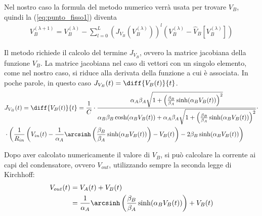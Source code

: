 	Nel nostro caso la formula del metodo numerico verrà usata per trovare $V_{B}$, quindi la (\ref{eq:punto_fisso1}) diventa
	\begin{equation}
		\label{eq:punto_fisso2}
		\begin{split}
			V_{B}^{(\lambda+1)} = V_{B}^{(\lambda)}-\sum_{l=0}^{L} \left(J_{V_{B}}(V_{B}^{(\lambda)})\right)^{l}(V_{B}^{(\lambda)}-\widehat V_{B}[V_{B}^{(\lambda)}])
		\end{split}
	\end{equation}
	
	Il metodo richiede il calcolo del termine $J_{V_{B}}$, ovvero la matrice jacobiana della funzione $V_{B}$. La matrice jacobiana nel caso di vettori con un singolo elemento, come nel nostro caso, si riduce alla derivata della funzione a cui è associata. In poche parole, in questo caso $J_{V_{B}}(t) = \diff{V_{B}(t)}{t}$.
	\begin{equation}
		\label{eq:jacobiana}
		\begin{split}
			&J_{V_{B}}(t) = \diff{V_{B}(t)}{t} = \frac{1}{C}\cdot\frac{\alpha_{A}\beta_{A}\sqrt{1+\left(\frac{\beta_{B}}{\beta_{A}}\sinh(\alpha_{B}V_{B}(t))\right)^{2}}}{\alpha_{B}\beta_{B}\cosh(\alpha_{B}V_{B}(t))+\alpha_{A}\beta_{A}\sqrt{1+\left(\frac{\beta_{B}}{\beta_{A}}\sinh(\alpha_{B}V_{B}(t))\right)^{2}}}\cdot\\&\cdot\left(\frac{1}{R_{in}}\left(V_{in}(t)-\frac{1}{\alpha_{A}} \arcsinh \left(\frac{\beta_{B}}{\beta_{A}} \sinh(\alpha_{B}V_{B}(t))\right)-V_{B}(t)\right)-2\beta_{B}\sinh(\alpha_{B}V_{B}(t))\right)\hspace{-7px}
		\end{split}
	\end{equation}
	
	Dopo aver calcolato numericamente il valore di $V_{B}$, si può calcolare la corrente ai capi del condensatore, ovvero $V_{out}$, utilizzando sempre la seconda legge di Kirchhoff:
	\begin{equation}
		\label{eq:tensione_finale}
		\begin{split}
			V_{out}(t) &= V_{A}(t)+V_{B}(t)\\
			&= \frac{1}{\alpha_{A}} \arcsinh \left(\frac{\beta_{B}}{\beta_{A}} \sinh(\alpha_{B}V_{B}(t))\right)+V_{B}(t)
		\end{split}
	\end{equation}
